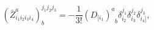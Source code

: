 \begin{equation}
\left( \bar{Z}_{i_{1}i_{2}i_{3}i_{4}}^{a}\right) _{b}^{j_{1}j_{2}j_{3}}=-%
\frac{1}{3!}\left( D_{[i_{1}}\right) _{\;\;b}^{a}\delta
_{i_{2}}^{j_{1}}\delta _{i_{3}}^{j_{2}}\delta _{i_{4}]}^{j_{3}},  \label{i19}
\end{equation}

